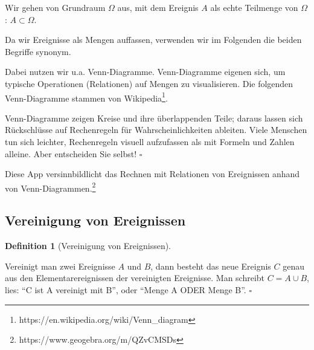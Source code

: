 \documentclass[
  ngerman,
  letterpaper,
  twoside,
  open=any]{scrbook}
\theoremstyle{definition}
\theoremstyle{plain}
\theoremstyle{definition}
\theoremstyle{definition}
\newtheorem{definition}{Definition}[chapter]
\theoremstyle{definition}
\theoremstyle{definition}
\theoremstyle{remark}
\begin{document}
Wir gehen von Grundraum \(\Omega\) aus, mit dem Ereignis \(A\) als echte
Teilmenge von \(\Omega\): \(A \subset \Omega\).

Da wir Ereignisse als Mengen auffassen, verwenden wir im Folgenden die
beiden Begriffe synonym.

Dabei nutzen wir u.a. Venn-Diagramme. Venn-Diagramme eigenen sich, um
typische Operationen (Relationen) auf Mengen zu visualisieren. Die
folgenden Venn-Diagramme stammen von Wikipedia\footnote{https://en.wikipedia.org/wiki/Venn\_diagram}.

\begin{tcolorbox}[enhanced jigsaw, arc=.35mm, bottomrule=.15mm, bottomtitle=1mm, breakable, colback=white, colbacktitle=quarto-callout-note-color!10!white, colframe=quarto-callout-note-color-frame, coltitle=black, left=2mm, leftrule=.75mm, opacityback=0, opacitybacktitle=0.6, rightrule=.15mm, title=\textcolor{quarto-callout-note-color}{\faInfo}\hspace{0.5em}{Wozu sind die Venn-Diagramme gut? Warum soll ich die lernen?}, titlerule=0mm, toprule=.15mm, toptitle=1mm]

Venn-Diagramme zeigen Kreise und ihre überlappenden Teile; daraus lassen
sich Rückschlüsse auf Rechenregeln für Wahrscheinlichkeiten ableiten.
Viele Menschen tun sich leichter, Rechenregeln visuell aufzufassen als
mit Formeln und Zahlen alleine. Aber entscheiden Sie selbst! \(\square\)

\end{tcolorbox}

Diese App versinnbildlicht das Rechnen mit Relationen von Ereignissen
anhand von Venn-Diagrammen.\footnote{https://www.geogebra.org/m/QZvCMSDs}

\subsection{Vereinigung von
Ereignissen}\label{vereinigung-von-ereignissen}

\begin{definition}[Vereinigung von
Ereignissen]\protect\hypertarget{def-mengen-verein}{}\label{def-mengen-verein}

Vereinigt man zwei Ereignisse \(A\) und \(B\), dann besteht das neue
Ereignis \(C\) genau aus den Elementarereignissen der vereinigten
Ereignisse. Man schreibt \(C = A \cup B\), lies: \enquote{C ist A
vereinigt mit B}, oder \enquote{Menge A ODER Menge B}. \(\square\)

\end{definition}
\end{document}
